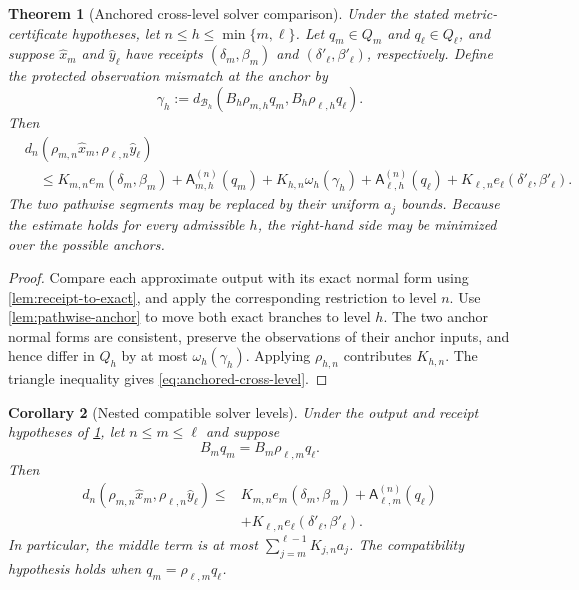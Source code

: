 \documentclass[11pt]{article}
\newtheorem{theorem}{Theorem}[section]
\newtheorem{corollary}[theorem]{Corollary}
\theoremstyle{definition}
\theoremstyle{remark}
\numberwithin{equation}{section}
\newcommand{\cB}{\mathcal B}
\begin{document}
\begin{theorem}[Anchored cross-level solver comparison]
\label{thm:anchored-cross-level}
Under the stated metric-certificate hypotheses, let
$n\le h\le\min\{m,\ell\}$. Let $q_m\in Q_m$ and
$q_\ell\in Q_\ell$, and suppose $\widehat x_m$ and $\widehat y_\ell$
have receipts $(\delta_m,\beta_m)$ and
$(\delta'_\ell,\beta'_\ell)$, respectively.  Define the protected
observation mismatch at the anchor by
\[
 \gamma_h
 :=
 d_{\cB_h}\!\left(
 B_h\rho_{m,h}q_m,
 B_h\rho_{\ell,h}q_\ell
 \right).
\]
Then
\begin{equation}\label{eq:anchored-cross-level}
\begin{split}
&d_n\!\left(
 \rho_{m,n}\widehat x_m,
 \rho_{\ell,n}\widehat y_\ell
 \right)
\\
&\quad\le
 K_{m,n}e_m(\delta_m,\beta_m)
 +\mathsf A_{m,h}^{(n)}(q_m)
 +K_{h,n}\omega_h(\gamma_h)
 +\mathsf A_{\ell,h}^{(n)}(q_\ell)
 +K_{\ell,n}e_\ell(\delta'_\ell,\beta'_\ell).
\end{split}
\end{equation}
The two pathwise segments may be replaced by their uniform $a_j$ bounds.
Because the estimate holds for every admissible $h$, the right-hand side may
be minimized over the possible anchors.
\end{theorem}

\begin{proof}
Compare each approximate output with its exact normal form using
\cref{lem:receipt-to-exact}, and apply the corresponding restriction to
level $n$.  Use \cref{lem:pathwise-anchor} to move both exact branches to
level $h$.  The two anchor normal forms are consistent, preserve the
observations of their anchor inputs, and hence differ in $Q_h$ by at most
$\omega_h(\gamma_h)$.  Applying $\rho_{h,n}$ contributes $K_{h,n}$.
The triangle inequality gives \eqref{eq:anchored-cross-level}.
\end{proof}

\begin{corollary}[Nested compatible solver levels]
\label{cor:nested-cross-level}
Under the output and receipt hypotheses of
\cref{thm:anchored-cross-level}, let $n\le m\le\ell$ and suppose
\[
 B_mq_m=B_m\rho_{\ell,m}q_\ell.
\]
Then
\[
\begin{split}
 d_n\!\left(
 \rho_{m,n}\widehat x_m,
 \rho_{\ell,n}\widehat y_\ell
 \right)
 \le{}&
 K_{m,n}e_m(\delta_m,\beta_m)
 +\mathsf A_{\ell,m}^{(n)}(q_\ell)\\
 &+K_{\ell,n}e_\ell(\delta'_\ell,\beta'_\ell).
\end{split}
\]
In particular, the middle term is at most
$\sum_{j=m}^{\ell-1}K_{j,n}a_j$.  The compatibility hypothesis holds when
$q_m=\rho_{\ell,m}q_\ell$.
\end{corollary}
\end{document}

